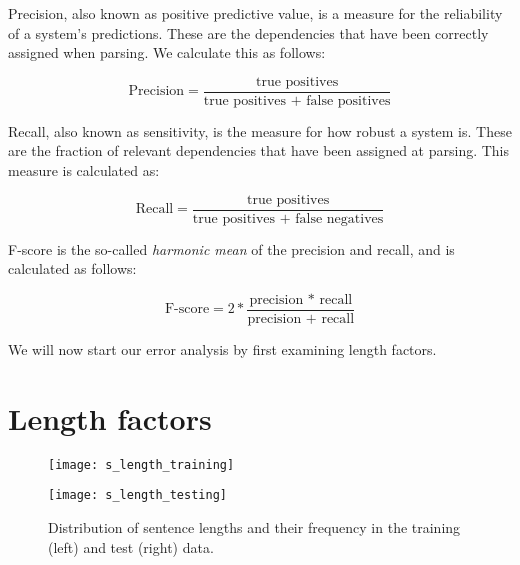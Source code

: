 Precision, also known as positive predictive value, is a measure for the reliability of a system's predictions. These are the dependencies that have been correctly assigned when parsing. We calculate this as follows:

\begin{equation*}
    \text{Precision} = \frac{\text{true positives}}{\text{true positives + false positives}}
\end{equation*}

\vspace{1ex}

Recall, also known as sensitivity, is the measure for how robust a system is. These are the fraction of relevant dependencies that have been assigned at parsing. This measure is calculated as:

\begin{equation*}
    \text{Recall} = \frac{\text{true positives}}{\text{true positives + false
            negatives}}
\end{equation*}

\vspace{1ex}

F-score is the so-called \textit{harmonic mean} of the precision and recall, and is calculated as follows:

\begin{equation*}
    \text{F-score} = 2*\frac{\text{precision * recall}}{\text{precision + recall}}
\end{equation*}

\vspace{1ex}

We will now start our error analysis by first examining length factors.
    
\section{Length factors}

\begin{figure}[h]
    \centering
    \begin{minipage}{0.50\textwidth}
        \centering
        \texttt{[image: s\_length\_training]}
    \end{minipage}\hfill
    \begin{minipage}{0.50\textwidth}
        \centering
        \texttt{[image: s\_length\_testing]}
    \end{minipage}
    \caption{Distribution of sentence lengths and their frequency in the training (left) and test (right) data.}
    \label{fig:sentence_length}
\end{figure}

